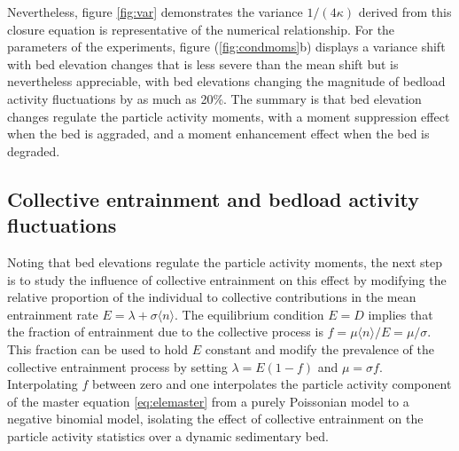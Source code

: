 Nevertheless, figure \ref{fig:var} demonstrates the variance $1/(4\kappa)$ derived from this closure equation is representative of the numerical relationship.
For the parameters of the \citet{Ancey2008} experiments, figure (\ref{fig:condmoms}b) displays a variance shift with bed elevation changes that is less severe than the mean shift but is nevertheless appreciable, with bed elevations changing the magnitude of bedload activity fluctuations by as much as 20\%.
The summary is that bed elevation changes regulate the particle activity moments, with a moment suppression effect when the bed is aggraded, and a moment enhancement effect when the bed is degraded.

\subsection{Collective entrainment and bedload activity fluctuations}
\label{sec:elecolent}
Noting that bed elevations regulate the particle activity moments, the next step is to study the influence of collective entrainment on this effect by modifying the relative proportion of the individual to collective contributions in the mean entrainment rate $E=\lambda + \sigma \langle n \rangle $.
The equilibrium condition $E=D$ implies that the fraction of entrainment due to the collective process is $f = \mu\langle n \rangle/E = \mu/\sigma$. This fraction can be used to hold $E$ constant and modify the prevalence of the collective entrainment process by setting $\lambda = E(1-f)$ and $\mu= \sigma f$. Interpolating $f$ between zero and one interpolates the particle activity component of the master equation \ref{eq:elemaster} from a purely Poissonian model to a negative binomial model, isolating the effect of collective entrainment on the particle activity statistics over a dynamic sedimentary bed.
